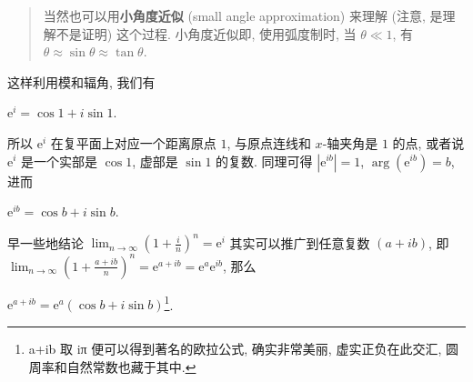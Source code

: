 \begin{quote}
当然也可以用\textbf{小角度近似} (small angle approximation) 来理解
(注意, 是理解不是证明) 这个过程. 小角度近似即, 使用弧度制时, 当
\(\theta\ll1\), 有 \(\theta\approx\sin\theta\approx\tan\theta\).
\end{quote}

这样利用模和辐角, 我们有

\(\mathrm{e}^i=\cos1+i\sin1\).

所以 \(\mathrm{e}^i\) 在复平面上对应一个距离原点 \(1\), 与原点连线和
\(x\)-轴夹角是 \(1\) 的点, 或者说 \(\mathrm{e}^i\) 是一个实部是
\(\cos1\), 虚部是 \(\sin1\) 的复数. 同理可得 \(|\mathrm{e}^{ib}|=1\),
\(\arg(\mathrm{e}^{ib})=b\), 进而

\(\mathrm{e}^{ib}=\cos b+i\sin b\).

早一些地结论
\(\lim_{n\rightarrow\infty}\left(1+\frac{i}{n}\right)^n=\mathrm{e}^i\)
其实可以推广到任意复数 \((a+ib)\), 即
\(\lim_{n\rightarrow\infty}\left(1+\frac{a+ib}{n}\right)^n=\mathrm{e}^{a+ib}=\mathrm{e}^{a}\mathrm{e}^{ib}\),
那么

\(\boxed{\mathrm{e}^{a+ib}=\mathrm{e}^a(\cos b+i\sin b)}\)\footnote{a+ib
  取 iπ 便可以得到著名的欧拉公式, 确实非常美丽, 虚实正负在此交汇,
  圆周率和自然常数也藏于其中.}.
